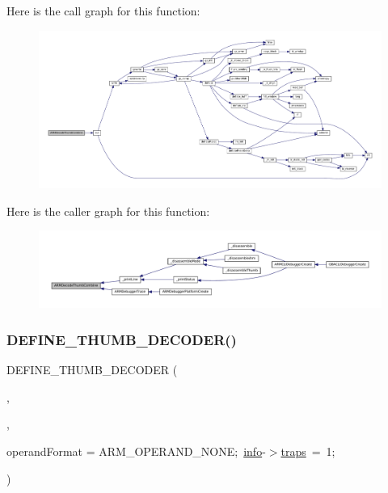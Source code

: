 Here is the call graph for this function\+:
\nopagebreak
\begin{figure}[H]
\begin{center}
\leavevmode
\includegraphics[width=350pt]{decoder-thumb_8c_ae170fe1498e80cd159ab197c56da10c6_cgraph}
\end{center}
\end{figure}
Here is the caller graph for this function\+:
\nopagebreak
\begin{figure}[H]
\begin{center}
\leavevmode
\includegraphics[width=350pt]{decoder-thumb_8c_ae170fe1498e80cd159ab197c56da10c6_icgraph}
\end{center}
\end{figure}
\mbox{\label{decoder-thumb_8c_a9fe7536ba50beb695d49424cac158ce2}} 
\subsubsection{\texorpdfstring{D\+E\+F\+I\+N\+E\+\_\+\+T\+H\+U\+M\+B\+\_\+\+D\+E\+C\+O\+D\+E\+R()}{DEFINE\_THUMB\_DECODER()}\hspace{0.1cm}{\footnotesize\ttfamily [1/4]}}
{\footnotesize\ttfamily D\+E\+F\+I\+N\+E\+\_\+\+T\+H\+U\+M\+B\+\_\+\+D\+E\+C\+O\+D\+ER (\begin{DoxyParamCaption}\item[{I\+LL}]{,  }\item[{I\+LL}]{,  }\item[{\mbox{\hyperlink{libretro_8h_a283ad41e4809f9c0ebe736a9861d8a91}{info}}-\/$>$}]{operand\+Format = {\ttfamily ARM\+\_\+OPERAND\+\_\+NONE;~\mbox{\hyperlink{libretro_8h_a283ad41e4809f9c0ebe736a9861d8a91}{info}}-\/$>$\mbox{\hyperlink{decoder-thumb_8c_afe08430c255629bed908d9bf22397277}{traps}}~=~1;} }\end{DoxyParamCaption})}

